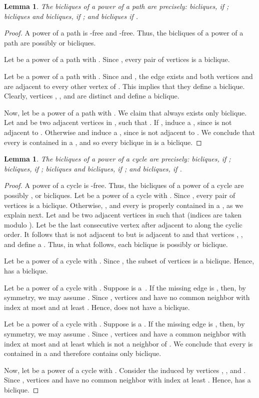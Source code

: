 \documentclass{article}
\newtheorem{lemma}[theorem]{Lemma}
\begin{document}
\begin{lemma}
\label{lem:powerofpathsbicliques}
 The bicliques of a power of a path  are precisely: 
  bicliques, if ;
  bicliques and  bicliques, if ; and
  bicliques if .
\end{lemma}
\begin{proof}
A power of a path is -free and -free. Thus, the bicliques of a
power of a path are possibly  or  bicliques. 

Let  be a power of a path with . Since , every pair of vertices is a  biclique.

Let  be a power of a path with . Since  and , the edge  exists
and both vertices  and  are adjacent to every other vertex of
. This implies that they define a  biclique. Clearly, vertices
, , and  are distinct and define a  biclique.

Now, let  be a power of a path with . We claim that always exists only  biclique. Let  and
 be two adjacent vertices in , such that . If ,  induce a , since  is not adjacent
to . Otherwise  and 
induce a , since  is not adjacent to . We
conclude that every  is contained in a , and so every biclique in
 is a  biclique.
\end{proof}

\begin{lemma}
\label{lem:powerofcyclesbicliques}
 The bicliques of a power of a cycle  are precisely:
   bicliques, if ;
   bicliques, if ;
   bicliques and  bicliques, if ; and
   bicliques, if .
\end{lemma}
\begin{proof}
A power of a cycle is -free. Thus, the bicliques of a power of a cycle
are possibly ,  or  bicliques. Let  be a
power of a cycle with . Since , every pair of
vertices is a  biclique. Otherwise, , and every  is
properly contained in a , as we explain next. Let  and  be two
adjacent vertices in  such that  (indices are taken modulo ). Let  be
the last consecutive vertex after  adjacent to  along the cyclic
order. It follows that  is not adjacent to  but  is adjacent to  and that vertices , , and  define a
. Thus, in what follows, each biclique is possibly  or 
biclique.

Let  be a power of a cycle  with . 
Since , the subset of vertices  is a  biclique. Hence,  has a 
biclique.

Let  be a power of a cycle  with . 
Suppose  is a~. If the missing edge is
, then, by symmetry, we may assume .
Since , vertices  and  have no common
neighbor with index at most  and at least . Hence,  does not
have a  biclique.

Let  be a power of a cycle  with .
Suppose  is a .
If the missing edge is , then, by symmetry, we may
assume . Since ,
vertices  and  have a common neighbor with index at most
 and at least  which is not a neighbor of
. We conclude that every  is contained in a  and 
therefore  contains only  biclique.

Now, let  be a power of a cycle  with . Consider
the  induced by vertices , , and . Since , vertices  and  have no common neighbor with index at least
. Hence,  has a  biclique.
\end{proof}
\end{document}
